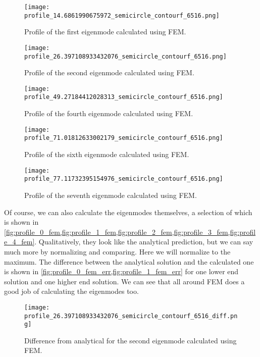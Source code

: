 \documentclass[10pt,a4paper,twocolumn]{article}
\begin{document}
\begin{figure}[!t]
    \centering
    \texttt{[image: profile\_14.6861990675972\_semicircle\_contourf\_6516.png]}
    \caption{Profile of the first eigenmode calculated using FEM.}
    \label{fig:profile_0_fem}
\end{figure}

\begin{figure}[!b]
    \centering
    \texttt{[image: profile\_26.397108933432076\_semicircle\_contourf\_6516.png]}
    \caption{Profile of the second eigenmode calculated using FEM.}
    \label{fig:profile_1_fem}
\end{figure}


\begin{figure}[!t]
    \centering
    \texttt{[image: profile\_49.27184412028313\_semicircle\_contourf\_6516.png]}
    \caption{Profile of the fourth eigenmode calculated using FEM.}
    \label{fig:profile_2_fem}
\end{figure}

\begin{figure}[!h]
    \centering
    \texttt{[image: profile\_71.01812633002179\_semicircle\_contourf\_6516.png]}
    \caption{Profile of the sixth eigenmode calculated using FEM.}
    \label{fig:profile_3_fem}
\end{figure}

\begin{figure}[!b]
    \centering
    \texttt{[image: profile\_77.11732395154976\_semicircle\_contourf\_6516.png]}
    \caption{Profile of the seventh eigenmode calculated using FEM.}
    \label{fig:profile_4_fem}
\end{figure}


Of course, we can also calculate the eigenmodes themselves, a selection of which is shown in \cref{fig:profile_0_fem,fig:profile_1_fem,fig:profile_2_fem,fig:profile_3_fem,fig:profile_4_fem}. Qualitatively, they look like the analytical prediction, but we can say much more by normalizing and comparing. Here we will normalize to the maximum. The difference between the analytical solution and the calculated one is shown in \cref{fig:profile_0_fem_err,fig:profile_1_fem_err} for one lower end solution and one higher end solution. We can see that all around FEM does a good job of calculating the eigenmodes too.

\clearpage

\begin{figure}[!t]
    \centering
    \texttt{[image: profile\_26.397108933432076\_semicircle\_contourf\_6516\_diff.png]}
    \caption{Difference from analytical for the second eigenmode calculated using FEM.}
    \label{fig:profile_0_fem_err}
\end{figure}
\end{document}
